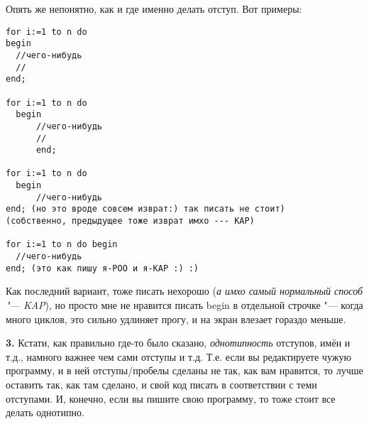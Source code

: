   Опять же непонятно, как и где именно делать отступ. Вот примеры:
  
\begin{codesample}\begin{verbatim}
for i:=1 to n do 
begin
  //чего-нибудь
  //
end;

for i:=1 to n do 
  begin
      //чего-нибудь
      //
      end;

for i:=1 to n do 
  begin
      //чего-нибудь
end; (но это вроде совсем изврат:) так писать не стоит)
(собственно, предыдущее тоже изврат имхо --- KAP)

for i:=1 to n do begin
  //чего-нибудь
end; (это как пишу я-POO и я-KAP :) :)
\end{verbatim}\end{codesample}

Как последний вариант, тоже писать нехорошо (\textsl{а имхо самый нормальный способ "--- KAP}), но просто мне 
не нравится писать begin в отдельной строчке "--- когда много циклов, это сильно удлиняет прогу, и 
на экран влезает гораздо меньше.

\textbf{3.} Кстати, как правильно где-то было сказано, \textit{однотипность} отступов, имён и т.д., намного важнее чем сами отступы и т.д. Т.е. если вы редактируете чужую программу, и в ней отступы/пробелы сделаны не так, как вам нравится, то лучше оставить так, как там сделано, и свой код писать в соответствии с теми отступами. И, конечно, если вы пишите свою программу, то тоже стоит все делать однотипно.